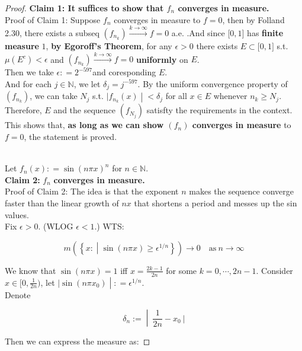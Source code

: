 \documentclass{qlnotes-export}
\begin{document}
\begin{proof}

\textbf{Claim 1: It suffices to show that \(f_{n}\) converges in measure.}\\
Proof of Claim 1: Suppose \(f_{n}\) converges in measure to \(f = 0\), then by Folland 2.30, there exists a subseq \((f_{n_{k}})\overset{k\rightarrow\infty}{\rightarrow}f = 0\) a.e. .And since \(\lbrack 0,1\rbrack\) has \textbf{finite measure} \(1\), \textbf{by Egoroff's Theorem}, for any \(\epsilon > 0\) there exists \(E \subset \lbrack 0,1\rbrack\) s.t. \(\mu(E^{c}) < \epsilon\) and \((f_{n_{k}})\overset{k\rightarrow\infty}{\rightarrow}f = 0\) \textbf{uniformly} on \(E\).\\
Then we take \(\epsilon: = 2^{- 597}\)and coresponding \(E\).\\
And for each \(j \in {\mathbb{N}}\), we let \(\delta_{j} = j^{- 597}\). By the uniform convergence property of \((f_{n_{k}})\), we can take \(N_{j}\) s.t. \(\left. |f_{n_{k}}(x) \middle| < \delta_{j} \right.\) for all \(x \in E\) whenever \(n_{k} \geq N_{j}\).\\
Therefore, \(E\) and the sequence \((f_{N_{j}})\) satisfty the requirements in the context.\\
This shows that, \textbf{as long as we can show \((f_{n})\) converges in measure} to \(f = 0\), the statement is proved.\\
\strut \\
Let \(f_{n}(x): = \sin(n\pi x)^{n}\) for \(n \in {\mathbb{N}}\).\\
\textbf{Claim 2:} \(f_{n}\) \textbf{converges in measure.}\\
Proof of Claim 2: The idea is that the exponent \(n\) makes the sequence converge faster than the linear growth of \(nx\) that shortens a period and messes up the sin values.\\
Fix \(\epsilon > 0\). (WLOG \(\epsilon < 1\).) WTS:

\[m(\left\{ x: \middle| \sin(n\pi x) \geq \epsilon^{1/n} \right\})\rightarrow 0\quad\text{as}\ n\rightarrow\infty\]

We know that \(\sin(n\pi x) = 1\) iff \(x = \frac{2k - 1}{2n}\) for some \(k = 0,\cdots,2n - 1\). Consider \(x \in \lbrack 0,\frac{1}{2n})\), let \(\left. |\sin(n\pi x_{0}) \middle| : = \epsilon^{1/n} \right.\).\\
Denote

\[\left. \delta_{n} := \middle| \ \frac{1}{2n} - x_{0}\ | \right.\]

Then we can express the measure as:


\end{proof}
\end{document}
